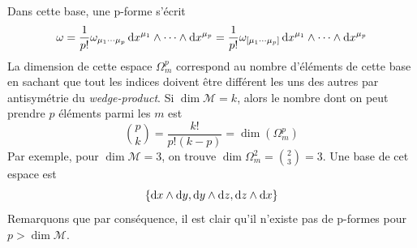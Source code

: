 Dans cette base, une p-forme s'écrit
\begin{equation}
    \omega = \frac{1}{p!}\omega_{\mu_1 \cdots \mu_p}\,\mathrm{d} x^{\mu_1}\wedge \cdots \wedge \mathrm{d} x^{\mu_p} =\frac{1}{p!}\omega_{[\mu_1 \cdots \mu_p]}\,\mathrm{d} x^{\mu_1}\wedge \cdots \wedge \mathrm{d} x^{\mu_p}
\end{equation}
La dimension de cette espace $\Omega^{p}_m$ correspond au nombre d'éléments de cette base en sachant que tout les indices doivent être différent les uns des autres par antisymétrie du \emph{wedge-product}. Si $\dim \mathcal{M} = k$, alors le nombre dont on peut prendre $p$ éléments parmi les $m$ est 
\begin{equation*}
{p \choose k} = \frac{k!}{p!(k-p)} = \dim(\Omega^{p}_m)
\end{equation*}
Par exemple, pour $\dim \mathcal{M} = 3$, on trouve $\dim \Omega_m^2 = {2\choose 3} = 3$. Une base de cet espace est
\begin{equation}
    \{\mathrm{d} x \wedge \mathrm{d} y , \mathrm{d} y \wedge \mathrm{d} z , \mathrm{d} z \wedge \mathrm{d} x\}
\end{equation} 
Remarquons que par conséquence, il est clair qu'il n'existe pas de p-formes pour $p>\dim \mathcal{M}$.


